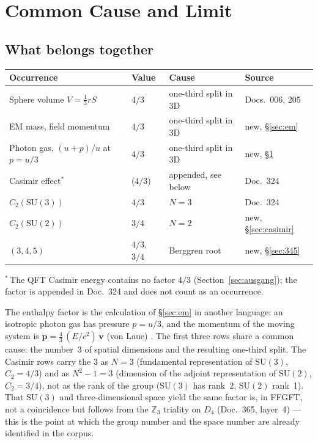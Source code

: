 \section{Common Cause and Limit}
\label{sec:ursache}

\subsection{What belongs together \SM}

\begin{center}
\begin{tabular}{@{}llll@{}}
\toprule
Occurrence & Value & Cause & Source \\
\midrule
Sphere volume $V = \tfrac13 rS$ & $4/3$ & one-third split in 3D & Docs.~006, 205 \\
EM mass, field momentum & $4/3$ & one-third split in 3D & new, §\ref{sec:em} \\
Photon gas, $(u+p)/u$ at $p=u/3$ & $4/3$ & one-third split in 3D & new, §\ref{sec:ursache} \\
Casimir effect$^{*}$ & ($4/3$) & appended, see below & Doc.~324 \\
$C_2(\mathrm{SU}(3))$ & $4/3$ & $N=3$ & Doc.~324 \\
$C_2(\mathrm{SU}(2))$ & $3/4$ & $N=2$ & new, §\ref{sec:casimir} \\
$(3,4,5)$ & $4/3$, $3/4$ & Berggren root & new, §\ref{sec:345} \\
\bottomrule
\end{tabular}
\end{center}
\noindent$^{*}$\,The QFT Casimir energy contains no factor $4/3$ (Section~\ref{sec:ausgang}); the factor is appended in Doc.~324 and does not count as an occurrence.


The enthalpy factor is the calculation of §\ref{sec:em} in another language:
an isotropic photon gas has pressure $p = u/3$, and the momentum of the moving
system is $\mathbf p = \tfrac{4}{3}\,(E/c^2)\,\mathbf v$ (von Laue) \EM.
The first three rows share a common cause: the number~3 of spatial dimensions
and the resulting one-third split. The Casimir rows carry the 3 as $N=3$
(fundamental representation of $\mathrm{SU}(3)$, $C_2=4/3$) and as $N^2-1=3$
(dimension of the adjoint representation of $\mathrm{SU}(2)$, $C_2=3/4$),
not as the rank of the group ($\mathrm{SU}(3)$ has rank~2, $\mathrm{SU}(2)$ rank~1). That $\mathrm{SU}(3)$ and three-dimensional space yield the
same factor is, in FFGFT, not a coincidence but follows from the $\mathbb Z_3$
triality on $D_4$ (Doc.~365, layer~4) --- this is the point at which the group
number and the space number are already identified in the corpus.

